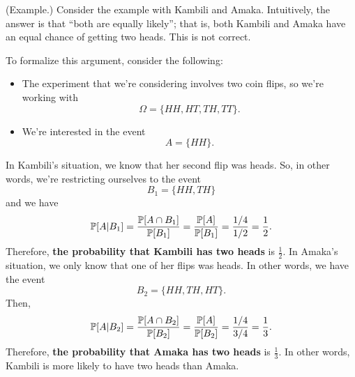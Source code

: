 \documentclass[letterpaper]{article}
\newcommand{\0}{\mathbf{0}}
\begin{document}
\begin{mdframed}
    (Example.) Consider the example with Kambili and Amaka. Intuitively, the answer is that ``both are equally likely''; that is, both Kambili and Amaka have an equal chance of getting two heads. This is not correct. 

    \bigskip 

    To formalize this argument, consider the following: 
    \begin{itemize}
        \item The experiment that we're considering involves two coin flips, so we're working with 
        \[\Omega = \{HH, HT, TH, TT\}.\]
        \item We're interested in the event
        \[A = \{HH\}.\]
    \end{itemize}
    In Kambili's situation, we know that her second flip was heads. So, in other words, we're restricting ourselves to the event 
    \[B_1 = \{HH, TH\}\] and we have 
    \[\mathbb{P}[A | B_1] = \frac{\mathbb{P}[A \cap B_1]}{\mathbb{P}[B_1]} = \frac{\mathbb{P}[A]}{\mathbb{P}[B_1]} = \frac{1/4}{1/2} = \frac{1}{2}.\]
    Therefore, \textbf{the probability that Kambili has two heads} is $\frac{1}{2}$. In Amaka's situation, we only know that one of her flips was heads. In other words, we have the event 
    \[B_2 = \{HH, TH, HT\}.\]
    Then, 
    \[\mathbb{P}[A | B_2] = \frac{\mathbb{P}[A \cap B_2]}{\mathbb{P}[B_2]} = \frac{\mathbb{P}[A]}{\mathbb{P}[B_2]} = \frac{1/4}{3/4} = \frac{1}{3}.\]
    Therefore, \textbf{the probability that Amaka has two heads} is $\frac{1}{3}$. In other words, Kambili is more likely to have two heads than Amaka.  
\end{mdframed}
\end{document}
